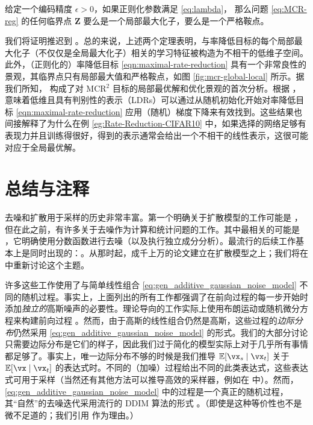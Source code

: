 \documentclass[../../book-main.tex]{subfiles}
\begin{document}
\begin{theorem}[\bf 良性优化景观]\label{thm:mcr-benign-opt-landscape}
	给定一个编码精度 $\epsilon > 0$，如果正则化参数满足 \eqref{eq:lambda}，
	那么问题 \eqref{eq:MCR-reg} 的任何临界点 $\bm Z$ 要么是一个局部最大化子，要么是一个严格鞍点。
\end{theorem}
我们将证明推迟到 \cite{wang2024global}。总的来说，上述两个定理表明，与率降低目标的每个局部最大化子（不仅仅是全局最大化子）相关的学习特征被构造为不相干的低维子空间。此外，（正则化的）率降低目标 \eqref{eqn:maximal-rate-reduction} 具有一个非常良性的景观，其临界点只有局部最大值和严格鞍点，如图 \ref{fig:mcr-global-local} 所示。据我们所知， 构成了对 MCR$^2$ 目标的局部最优解和优化景观的首次分析。根据 \cite{sun2015nonconvex,lee2016gradient}， 意味着低维且具有判别性的表示（LDRs）可以通过从随机初始化开始对率降低目标 \eqref{eqn:maximal-rate-reduction} 应用（随机）梯度下降来有效找到。这些结果也间接解释了为什么在例 \ref{eg:Rate-Reduction-CIFAR10} 中，如果选择的网络足够有表现力并且训练得很好，得到的表示通常会给出一个不相干的线性表示，这很可能对应于全局最优解。




\section{总结与注释}

去噪和扩散用于采样的历史非常丰富。第一个明确关于扩散模型的工作可能是 \cite{Sohl-Dickstein2015}，但在此之前，有许多关于去噪作为计算和统计问题的工作。其中最相关的可能是 \cite{hyvarinen05a}，它明确使用分数函数进行去噪（以及执行独立成分分析）。最流行的后续工作基本上是同时出现的：\cite{ho2020denoising,song2019}。从那时起，成千上万的论文建立在扩散模型之上；我们将在  中重新讨论这个主题。

许多这些工作使用了与简单线性组合 \eqref{eq:gen_additive_gaussian_noise_model} 不同的随机过程。事实上，上面列出的所有工作都强调了在前向过程的每一步开始时添加\textit{独立的}高斯噪声的必要性。理论导向的工作实际上使用布朗运动或随机微分方程来构建前向过程 \cite{song2020score}。然而，由于高斯的线性组合仍然是高斯，这些过程的\textit{边际分布}仍然采用 \eqref{eq:gen_additive_gaussian_noise_model} 的形式。我们的大部分讨论只需要边际分布是它们的样子，因此我们过于简化的模型实际上对于几乎所有事情都足够了。事实上，唯一边际分布不够的时候是我们推导 \(\Ex[\vx_{s} \mid \vx_{t}]\) 关于 \(\Ex[\vx \mid \vx_{t}]\) 的表达式时。不同的（加噪）过程给出不同的此类表达式，这些表达式可用于采样（当然还有其他方法可以推导高效的采样器，例如在 \cite{song2020score} 中）。然而，\eqref{eq:gen_additive_gaussian_noise_model} 中的过程是一个真正的随机过程，其“自然”的去噪迭代采用流行的 DDIM 算法的形式 \cite{song2020denoising}。（即使是这种等价性也不是微不足道的；我们引用 \cite{de2025distributional} 作为理由。）
\end{document}
